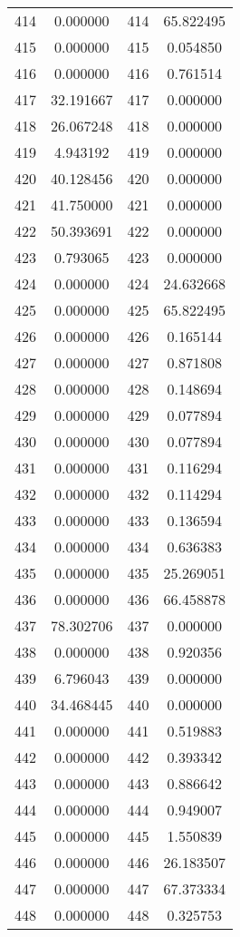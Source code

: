 \documentclass[12pt]{article}
\begin{document}
\begin{longtable}{@{}cccc@{}}
414 & 0.000000 & 414 & 65.822495 \\
415 & 0.000000 & 415 & 0.054850 \\
416 & 0.000000 & 416 & 0.761514 \\
417 & 32.191667 & 417 & 0.000000 \\
418 & 26.067248 & 418 & 0.000000 \\
419 & 4.943192 & 419 & 0.000000 \\
420 & 40.128456 & 420 & 0.000000 \\
421 & 41.750000 & 421 & 0.000000 \\
422 & 50.393691 & 422 & 0.000000 \\
423 & 0.793065 & 423 & 0.000000 \\
424 & 0.000000 & 424 & 24.632668 \\
425 & 0.000000 & 425 & 65.822495 \\
426 & 0.000000 & 426 & 0.165144 \\
427 & 0.000000 & 427 & 0.871808 \\
428 & 0.000000 & 428 & 0.148694 \\
429 & 0.000000 & 429 & 0.077894 \\
430 & 0.000000 & 430 & 0.077894 \\
431 & 0.000000 & 431 & 0.116294 \\
432 & 0.000000 & 432 & 0.114294 \\
433 & 0.000000 & 433 & 0.136594 \\
434 & 0.000000 & 434 & 0.636383 \\
435 & 0.000000 & 435 & 25.269051 \\
436 & 0.000000 & 436 & 66.458878 \\
437 & 78.302706 & 437 & 0.000000 \\
438 & 0.000000 & 438 & 0.920356 \\
439 & 6.796043 & 439 & 0.000000 \\
440 & 34.468445 & 440 & 0.000000 \\
441 & 0.000000 & 441 & 0.519883 \\
442 & 0.000000 & 442 & 0.393342 \\
443 & 0.000000 & 443 & 0.886642 \\
444 & 0.000000 & 444 & 0.949007 \\
445 & 0.000000 & 445 & 1.550839 \\
446 & 0.000000 & 446 & 26.183507 \\
447 & 0.000000 & 447 & 67.373334 \\
448 & 0.000000 & 448 & 0.325753 \\

\end{longtable}
\end{document}
